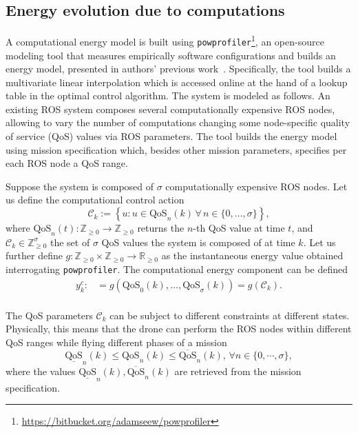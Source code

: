 \documentclass[letterpaper,10pt,conference]{ieeeconf}
\newcommand{\stt}[1]{{\small\tt #1}} %
\newcommand{\powprof}{\stt{powprofiler}}
\begin{document}
\subsection{Energy evolution due to computations}

A computational energy model is built using \powprof{}\footnote{\label{cross-ref:powprof-link}\url{https://bitbucket.org/adamseew/powprofiler}}, an open-source modeling tool that measures empirically software configurations and builds an energy model, presented in authors' previous work~\cite{seewald2019coarse}. Specifically, the tool builds a multivariate linear interpolation which is accessed online at the hand of a lookup table in the optimal control algorithm. The system is modeled as follows. An existing ROS system composes several computationally expensive ROS nodes, allowing to vary the number of computations changing some node-specific quality of service (QoS) values via ROS parameters. The tool builds the energy model using mission specification which, besides other mission parameters, specifies per each ROS node a QoS range.

Suppose the system is composed of $\sigma$ computationally expensive ROS nodes. Let us define the computational control action
\begin{equation}\label{eqq:12}
  \mathcal{C}_k:=\left\{u:u\in\text{QoS}_n(k)\,\forall\,n\in\{0,\dots,\sigma\}\right\},
\end{equation}
where $\text{QoS}_n(t):\mathbb{Z}_{\geq 0}\rightarrow\mathbb{Z}_{\geq 0}$ returns the $n$-th QoS value at time $t$, and $\mathcal{C}_k\in\mathbb{Z}_{\geq 0}^\sigma$ the set of $\sigma$ QoS values the system is composed of at time $k$. Let us further define $g:\mathbb{Z}_{\geq 0}\times\mathbb{Z}_{\geq 0}\rightarrow\mathbb{R}_{\geq 0}$ as the instantaneous energy value obtained interrogating \powprof{}. The computational energy component can be defined
\begin{equation}\label{eqq:13}\begin{split}
  y_k^c:&=g\left(\text{QoS}_0\left(k\right),\dots,\text{QoS}_\sigma\left(k\right)\right)=g\left(\mathcal{C}_{k}\right).\\
\end{split}\end{equation}

The QoS parameters $\mathcal{C}_k$ can be subject to different constraints at different states. Physically, this means that the drone can perform the ROS nodes within different QoS ranges while flying different phases of a mission
\begin{equation}\label{eqq:14}
  \underline{\text{QoS}}_n(k)\leq \text{QoS}_n(k)\leq \overline{\text{QoS}}_n(k),\,\forall n\in\{0,\cdots,\sigma\},
\end{equation}
where the values $\underline{\text{QoS}}_n(k),\overline{\text{QoS}}_n(k)$ are retrieved from the mission specification.
\end{document}
